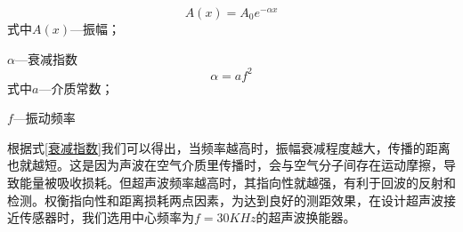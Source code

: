	\begin{equation}
		A(x)=A_0 e^{-\alpha x}
		\label{振幅方程}
	\end{equation}
	式中\quad$A(x)$---振幅；\par
		\quad$\alpha$---衰减指数
	\begin{equation}
		\alpha=a f^2
		\label{衰减指数}
	\end{equation}
	式中\quad $a$---介质常数；\par
	   \quad $f$---振动频率\par
    根据式\ref{衰减指数}我们可以得出，当频率越高时，振幅衰减程度越大，传播的距离也就越短。这是因为声波在空气介质里传播时，会与空气分子间存在运动摩擦，导致能量被吸收损耗。但超声波频率越高时，其指向性就越强，有利于回波的反射和检测。权衡指向性和距离损耗两点因素，为达到良好的测距效果，在设计超声波接近传感器时，我们选用中心频率为$f=30KHz$的超声波换能器。
